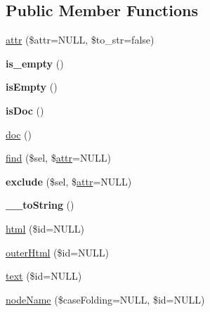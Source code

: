 \subsection*{Public Member Functions}
\begin{DoxyCompactItemize}
\item 
\mbox{\hyperlink{classduzun_1_1hQuery_1_1Node_a530ab9e8edeb1e876b369dcb321208c0}{attr}} (\$attr=N\+U\+LL, \$to\+\_\+str=false)
\item 
\mbox{\label{classduzun_1_1hQuery_1_1Node_a294afb6108604528401fbb1fa15b60cd}} 
{\bfseries is\+\_\+empty} ()
\item 
\mbox{\label{classduzun_1_1hQuery_1_1Node_a6e7b9f5f20609fc9a3e99ed52ec99910}} 
{\bfseries is\+Empty} ()
\item 
\mbox{\label{classduzun_1_1hQuery_1_1Node_af530dc0a779ec124954c7c535262c104}} 
{\bfseries is\+Doc} ()
\item 
\mbox{\hyperlink{classduzun_1_1hQuery_1_1Node_abd060c044c66e49189d8e4fb491f3b3d}{doc}} ()
\item 
\mbox{\hyperlink{classduzun_1_1hQuery_1_1Node_afec94d07336cc52b22aaf7b3cbcf7b27}{find}} (\$sel, \$\mbox{\hyperlink{classduzun_1_1hQuery_1_1Node_a530ab9e8edeb1e876b369dcb321208c0}{attr}}=N\+U\+LL)
\item 
\mbox{\label{classduzun_1_1hQuery_1_1Node_a4736b811ac4bd8d83dad2ca2b6f68c58}} 
{\bfseries exclude} (\$sel, \$\mbox{\hyperlink{classduzun_1_1hQuery_1_1Node_a530ab9e8edeb1e876b369dcb321208c0}{attr}}=N\+U\+LL)
\item 
\mbox{\label{classduzun_1_1hQuery_1_1Node_a73f08f113f804a35f5b0f9b8b8b40d09}} 
{\bfseries \+\_\+\+\_\+to\+String} ()
\item 
\mbox{\hyperlink{classduzun_1_1hQuery_1_1Node_a6a251f5f93690fabb794c673388dd49b}{html}} (\$id=N\+U\+LL)
\item 
\mbox{\hyperlink{classduzun_1_1hQuery_1_1Node_ab3fb9d5a73f184da3a2a70d7ef73827c}{outer\+Html}} (\$id=N\+U\+LL)
\item 
\mbox{\hyperlink{classduzun_1_1hQuery_1_1Node_ad5395ffe77dd4f111fcc7f59d211fbfa}{text}} (\$id=N\+U\+LL)
\item 
\mbox{\hyperlink{classduzun_1_1hQuery_1_1Node_a82cc8fc0d4acd22bb0cd3fd50389f32d}{node\+Name}} (\$case\+Folding=N\+U\+LL, \$id=N\+U\+LL)

\end{DoxyCompactItemize}
